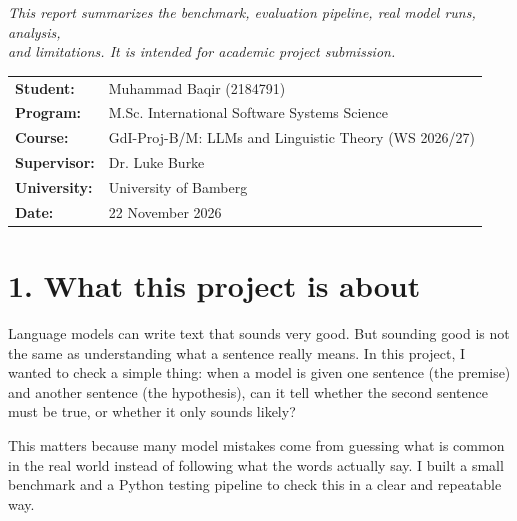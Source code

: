 \documentclass[11pt, a4paper]{article}
\begin{document}
\vspace{1.4em}
\begin{center}
    \small\itshape\color{footergray}
    This report summarizes the benchmark, evaluation pipeline, real model runs, analysis,\\
    and limitations. It is intended for academic project submission.
\end{center}

\newpage

\noindent
\begin{tabular}{@{}ll@{}}
\textbf{Student:} & Muhammad Baqir (2184791) \\
\textbf{Program:} & M.Sc. International Software Systems Science \\
\textbf{Course:} & GdI-Proj-B/M: LLMs and Linguistic Theory (WS 2026/27) \\
\textbf{Supervisor:} & Dr. Luke Burke \\
\textbf{University:} & University of Bamberg \\
\textbf{Date:} & 22 November 2026 \\
\end{tabular}

\vspace{0.6em}
\noindent{\color{rulegray}\rule{\textwidth}{0.6pt}}

\FloatBarrier
{}
\section*{\color{bambergnavy} 1. What this project is about}
Language models can write text that sounds very good. But sounding good is not the same as understanding what a sentence really means. In this project, I wanted to check a simple thing: when a model is given one sentence (the premise) and another sentence (the hypothesis), can it tell whether the second sentence must be true, or whether it only sounds likely?

This matters because many model mistakes come from guessing what is common in the real world instead of following what the words actually say. I built a small benchmark and a Python testing pipeline to check this in a clear and repeatable way.

\FloatBarrier
{}
\end{document}
